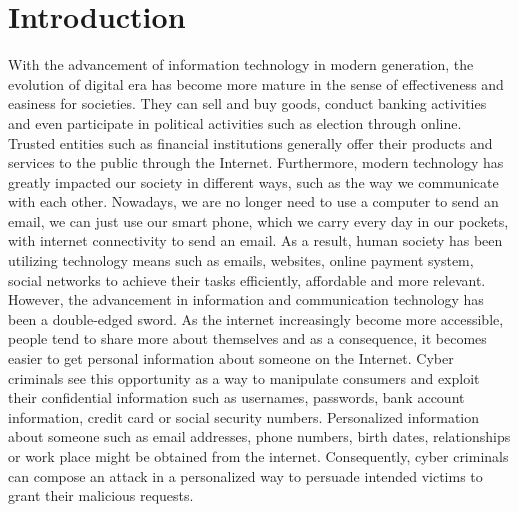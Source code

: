 
\chapter{Introduction}

%
With the advancement of information technology in modern generation,
the evolution of digital era has become more mature in the sense of
effectiveness and easiness for societies. They can sell and buy goods,
conduct banking activities and even participate in political activities
such as election through online. Trusted entities such as financial
institutions generally offer their products and services to the public
through the Internet. Furthermore, modern technology has greatly impacted
our society in different ways, such as the way we communicate with
each other. Nowadays, we are no longer need to use a computer to send
an email, we can just use our smart phone, which we carry every day
in our pockets, with internet connectivity to send an email. As a
result, human society has been utilizing technology means such as
emails, websites, online payment system, social networks to achieve
their tasks efficiently, affordable and more relevant. However, the
advancement in information and communication technology has been a
double-edged sword. As the internet increasingly become more accessible,
people tend to share more about themselves and as a consequence, it
becomes easier to get personal information about someone on the Internet.
Cyber criminals see this opportunity as a way to manipulate consumers
and exploit their confidential information such as usernames, passwords,
bank account information, credit card or social security numbers.
Personalized information about someone such as email addresses, phone
numbers, birth dates, relationships or work place might be obtained
from the internet. Consequently, cyber criminals can compose an attack
in a personalized way to persuade intended victims to grant their
malicious requests.

